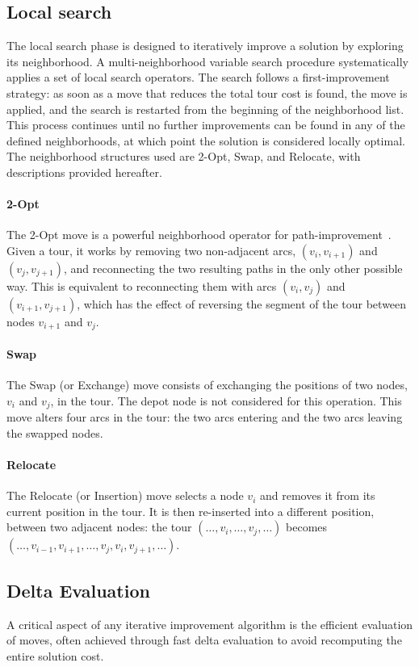 \documentclass[twocolumn, switch]{article} %
\begin{document}
\subsection{Local search}
The local search phase is designed to iteratively improve a solution by exploring its neighborhood. A multi-neighborhood variable search procedure systematically applies a set of local search operators. The search follows a first-improvement strategy: as soon as a move that reduces the total tour cost is found, the move is applied, and the search is restarted from the beginning of the neighborhood list.
This process continues until no further improvements can be found in any of the defined neighborhoods, at which point the solution is considered locally optimal. The neighborhood structures used are 2-Opt, Swap, and Relocate, with descriptions provided hereafter.

\paragraph{2-Opt} The 2-Opt move is a powerful neighborhood operator for path-improvement~\cite{Croes1958}. Given a tour, it works by removing two non-adjacent arcs, $(v_i, v_{i+1})$ and $(v_j, v_{j+1})$, and reconnecting the two resulting paths in the only other possible way. This is equivalent to reconnecting them with arcs $(v_i, v_j)$ and $(v_{i+1}, v_{j+1})$, which has the effect of reversing the segment of the tour between nodes $v_{i+1}$ and $v_j$.

\paragraph{Swap} The Swap (or Exchange) move consists of exchanging the positions of two nodes, $v_i$ and $v_j$, in the tour. The depot node is not considered for this operation. This move alters four arcs in the tour: the two arcs entering and the two arcs leaving the swapped nodes.

\paragraph{Relocate} The Relocate (or Insertion) move selects a node $v_i$ and removes it from its current position in the tour. It is then re-inserted into a different position, between two adjacent nodes:
the tour $(\ldots, v_i, \ldots, v_j, \ldots)$ becomes $(\ldots, v_{i-1}, v_{i+1}, \ldots, v_j, v_i, v_{j+1}, \ldots)$.

\subsection{Delta Evaluation}
A critical aspect of any iterative improvement algorithm is the efficient evaluation of moves, often achieved through fast delta evaluation to avoid recomputing the entire solution cost.
\end{document}
